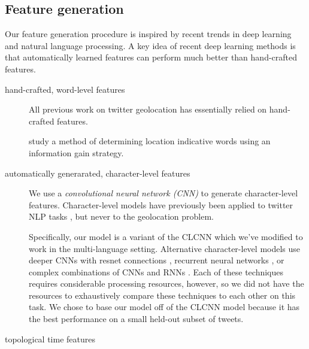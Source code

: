 \documentclass[sigconf,10pt]{acmart}
\newcommand{\defn}[1]{\textit{#1}}
\begin{document}
\subsection{Feature generation}

Our feature generation procedure is inspired by recent trends in deep learning and natural language processing.
A key idea of recent deep learning methods is that automatically learned features can perform much better than hand-crafted features.

\begin{description}
    \item[hand-crafted, word-level features]
        All previous work on twitter geolocation has essentially relied on hand-crafted features.

        \citet{han2012geolocation} study a method of determining location indicative words using an information gain strategy.


    \item[automatically generarated, character-level features]
        We use a \defn{convolutional neural network (CNN)} to generate character-level features.
        Character-level models have previously been applied to twitter NLP tasks \citep[e.g.][]{dhingra2016tweet2vec,severyn2015unitn},
        but never to the geolocation problem.

        Specifically, our model is a variant of the CLCNN \citep{zhang2015character} which we've modified to work in the multi-language setting.
        Alternative character-level models use deeper CNNs with resnet connections \citep{conneau2017very}, recurrent neural networks \citep{chung2016character}, or complex combinations of CNNs and RNNs \citep{kim2016character,jozefowicz2016exploring}.
        Each of these techniques requires considerable processing resources, however, 
        so we did not have the resources to exhaustively compare these techniques to each other on this task.
        We chose to base our model off of the CLCNN model because it has the best performance on a small held-out subset of tweets.

    \item[topological time features]
\end{description}
\end{document}
